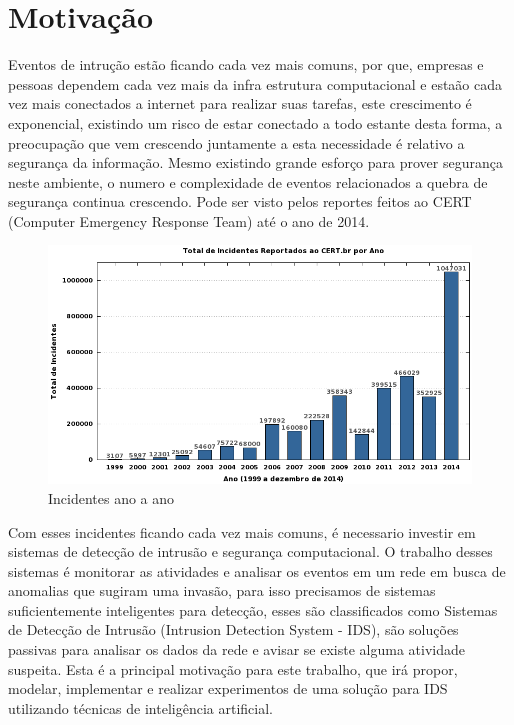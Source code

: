 \documentclass[
	12pt,				%
	openright,			%
	oneside,
	a4paper,			%
	english,			%
	french,				%
	spanish,			%
	brazil				%
	]{abntex2}
\begin{document}
\section{Motivação}

Eventos de intrução estão ficando cada vez mais comuns, por que,
empresas e pessoas dependem cada vez mais da infra estrutura computacional e estaão cada vez mais conectados a internet para realizar suas tarefas, este crescimento é exponencial, existindo um risco de estar conectado a todo estante desta forma, 
a preocupação que vem crescendo juntamente a esta necessidade é relativo a segurança da informação.
Mesmo existindo grande esforço para prover segurança neste ambiente, o numero e complexidade de eventos relacionados a quebra de segurança continua crescendo. Pode ser visto pelos reportes feitos ao CERT (Computer Emergency Response Team) até o ano de 2014.
\begin{figure}[!htb]
     \centering
     \includegraphics[scale=0.5]{Imagens/IntroGraf.png}
     \caption{Incidentes ano a ano}
\end{figure}
Com esses incidentes ficando cada vez mais comuns, é necessario investir em sistemas de detecção de intrusão e segurança computacional.   
O trabalho desses sistemas é monitorar as atividades e analisar os eventos em um rede em busca de anomalias que sugiram uma invasão, para isso precisamos de sistemas suficientemente inteligentes para detecção, esses são classificados como Sistemas de Detecção de Intrusão (Intrusion Detection System
- IDS), são soluções passivas para analisar os dados da rede e avisar se existe alguma atividade suspeita.
Esta é a principal motivação para este trabalho, que irá propor, modelar, implementar e realizar experimentos de uma solução para IDS utilizando técnicas de inteligência artificial.
\end{document}
